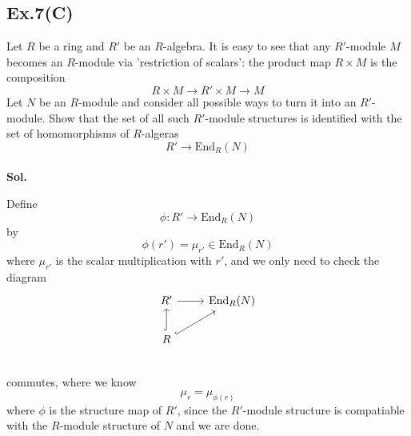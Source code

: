 \documentclass[lang=en,11pt,a4paper,citestyle =authoryear]{elegantpaper}
\begin{document}
\subsection*{Ex.7(C)} 
Let $R$ be a ring and $R'$ be an $R$-algebra. It is easy to see that any $R'$-module $M$ becomes an $R$-module via 'restriction of scalars': the product map $R\times M$ is the composition
\[R\times M \to R'\times M \to M\]
Let $N$ be an $R$-module and consider all possible ways to turn it into an $R'$-module. Show that the set of all such $R'$-module structures is identified with the set of homomorphisms of $R$-algeras
\[R' \to \text{End}_R(N)\]
\vspace{0.5em}\\
\textbf{Sol.} \par
    Define
    \[
    \phi:R' \to \text{End}_R(N)
    \]
    by
    \[
    \phi(r') = \mu_{r'} \in \text{End}_R(N)
    \]
    where $\mu_{r'}$ is the scalar multiplication with $r'$, and we only need to check the diagram
    \[
    \begin{tikzcd}
        R'\arrow[r] & \text{End}_R(N) \\
        R\arrow[hookrightarrow]{u}\arrow[hookrightarrow]{ru} & \\
    \end{tikzcd}
    \]
    commutes, where we know
    \[
    \mu_r = \mu_{\phi(r)}
    \]
    where $\phi$ is the structure map of $R'$, since the $R'$-module structure is compatiable with the $R$-module structure of $N$ and we are done.
\vspace{0.5em}


\addappheadtotoc
\end{document}
